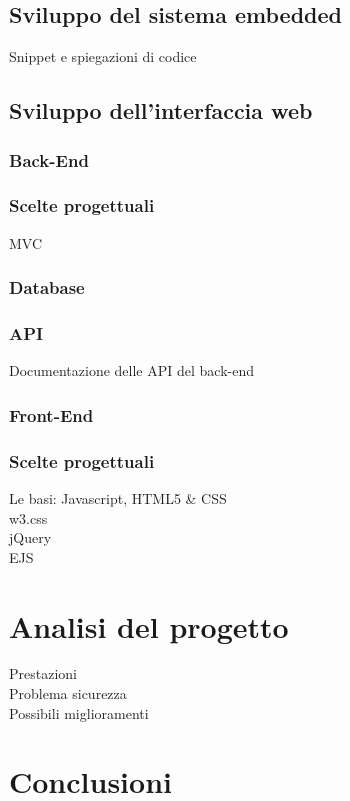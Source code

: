 \documentclass[12pt]{report}
\begin{document}
\section{Sviluppo del sistema embedded}
Snippet e spiegazioni di codice
\\

%
%
\section{Sviluppo dell'interfaccia web}
%
\subsection{Back-End}
\subsection*{Scelte progettuali}
MVC
\subsection*{Database}
%
\subsection*{API}
Documentazione delle API del back-end
%
\subsection{Front-End}
\subsection*{Scelte progettuali}
Le basi: Javascript, HTML5 \& CSS
\\
w3.css
\\
jQuery
\\
EJS
\\
%
% 
\chapter{Analisi del progetto}
\label{cap4}
Prestazioni
\\
Problema sicurezza
\\
Possibili miglioramenti
\\
%
% 
\chapter{Conclusioni}


\label{cap5}
%
%
\end{document}
